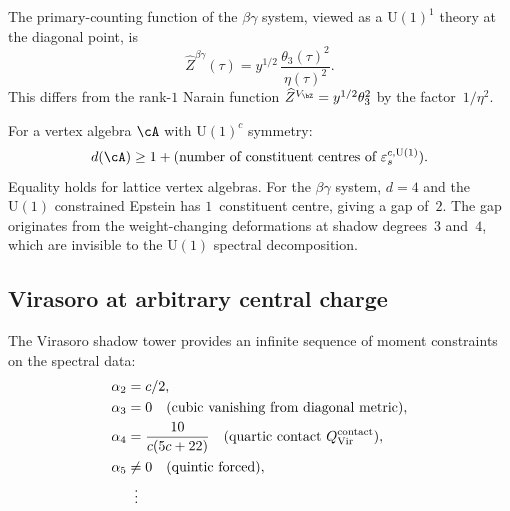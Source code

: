 \begin{proposition}
\label{prop:bg-primary-counting}
\ClaimStatusProvedElsewhere
The primary-counting function of the $\beta\gamma$ system,
viewed as a $\mathrm{U}(1)^1$ theory at the diagonal point, is
\begin{equation}\label{eq:bg-Zhat}
 \widehat{Z}^{\beta\gamma}(\tau)
 = y^{1/2}\,\frac{\theta_3(\tau)^2}{\eta(\tau)^2}.
\end{equation}
This differs from the rank-$1$ Narain function
$\widehat{Z}^{V_{\bZ}}=y^{1/2}\theta_3^2$ by the factor~$1/\eta^2$.
\end{proposition}

\begin{theorem}
\label{thm:refined-shadow-spectral}
\ClaimStatusProvedHere
For a vertex algebra $\cA$ with $\mathrm{U}(1)^c$ symmetry:
\begin{equation}\label{eq:refined-inequality}
 d(\cA) \ge 1 + (\text{number of constituent centres of
 $\varepsilon^{c,\mathrm{U}(1)}_s$}).
\end{equation}
Equality holds for lattice vertex algebras. For the $\beta\gamma$
system, $d=4$ and the $\mathrm{U}(1)$ constrained Epstein has
$1$~constituent centre, giving a gap of~$2$. The gap originates from
the weight-changing deformations at shadow degrees~$3$ and~$4$, which
are invisible to the $\mathrm{U}(1)$ spectral decomposition.
\end{theorem}

\subsection{Virasoro at arbitrary central charge}

The Virasoro shadow tower provides an
infinite sequence of moment constraints on the spectral data:
\begin{align}
 \alpha_2 &= c/2, \label{eq:vir-alpha2}\\
 \alpha_3 &= 0 \quad\text{(cubic vanishing from diagonal metric)},
 \label{eq:vir-alpha3}\\
 \alpha_4 &= \frac{10}{c(5c+22)} \quad\text{(quartic contact
 $Q^{\mathrm{contact}}_{\mathrm{Vir}}$)}, \label{eq:vir-alpha4}\\
 \alpha_5 &\ne 0 \quad\text{(quintic forced)},
 \label{eq:vir-alpha5}\\
 &\;\;\vdots \notag
\end{align}

